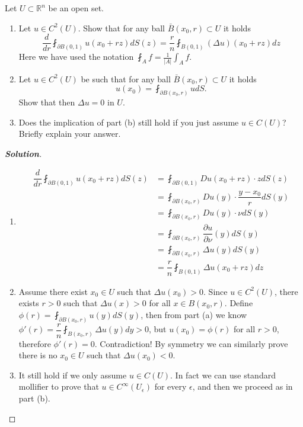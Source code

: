 \documentclass[11pt,reqno]{amsart}
\newcommand{\R}{\mathbb{R}}
\newcommand{\<}{\langle}
\renewcommand{\>}{\rangle}
\newcommand{\norm}[1]{\vert#1\vert}
\begin{document}
\begin{enumerate}[label={\arabic*.}]
\newpage
\begin{tcolorbox}
\item Let $U \subset \R^n$ be an open set.
\begin{enumerate}[leftmargin=*]
\item Let $u\in C^2(U)$. Show that for any ball $\bar{B}(x_0, r) \subset U$ it holds
\begin{equation*}
\frac{d}{dr}  \fint_{\partial B(0,1)} u(x_0 + rz)dS(z) = \frac{r}{n} \fint_{B(0,1)} (\Delta u)(x_0 +rz) dz
\end{equation*}
Here we have used the notation $\fint_A f = \frac{1}{\norm{A}} \int_A f$.
\item Let $u\in C^2(U)$ be such that for any ball $\bar{B}(x_0, r)\subset U$ it holds
\begin{equation*}
u(x_0) = \fint_{\partial B (x_0, r)} u dS.
\end{equation*}
Show that then $\Delta u = 0$ in $U$.
\item Does the implication of part (b) still hold if you just assume $u \in C(U)$? Briefly explain your answer.
\end{enumerate}
\end{tcolorbox}
\bigskip


\begin{proof}[\bf{Solution}]
\leavevmode
\begin{enumerate}
\item
\begin{align*}
\dfrac{d}{dr}  \fint_{\partial B(0,1)} u(x_0 + rz)dS(z) &= \fint_{\partial B(0,1)} Du(x_0 + rz) \cdot z dS(z)\\
&=
\fint_{\partial B(x_0,r)} Du(y) \cdot \dfrac{y-x_0}{r} dS(y)\\
&=
\fint_{\partial B(x_0, r)}Du(y) \cdot \nu dS(y)\\
&=
\fint_{\partial B(x_0, r)} \dfrac{\partial u}{\partial \nu}(y) dS(y)\\
&=
\fint_{\partial B(x_0, r)} \Delta u(y) dS(y)\\
&=
\dfrac{r}{n} \fint_{B(0,1)} \Delta u (x_0 + rz) dz
\end{align*}
\item Assume there exist $x_0 \in U$ such that $\Delta u(x_0) >0$. Since $u\in C^2(U)$, there exists $r>0$ such that $\Delta u(x) >0$ for all $x\in B(x_0, r)$.  Define $\phi(r)= \fint_{\partial B(x_0, r)} u(y)dS(y)$, then from part (a) we know $\phi' (r) = \dfrac{r}{n} \fint_{B(x_0,r)} \Delta u (y) dy >0$, but $u(x_0)=\phi (r)$ for all $r>0$, therefore $\phi'(r) = 0$. Contradiction! By symmetry we can similarly prove there is no $x_0 \in U$ such that $\Delta u(x_0) <0$.
\item It still hold if we only assume $u \in C(U)$. In fact we can use standard mollifier to prove that $u\in C^\infty (U_\epsilon)$ for every $\epsilon$, and then we proceed as in part (b).
\end{enumerate}
\end{proof}







\end{enumerate}
\end{document}
